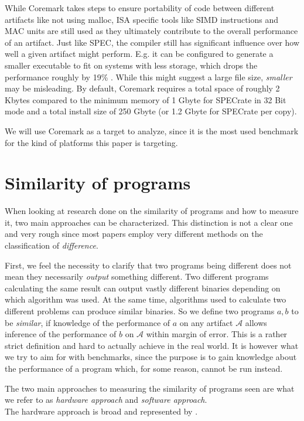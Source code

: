 \documentclass[../bachelor_paper.tex]{subfiles}
\begin{document}
While Coremark takes steps to ensure portability of code between different artifacts like not using malloc, \ac{ISA} specific tools like \ac{SIMD} instructions and \ac{MAC unit}s are still used as they ultimately contribute to the overall performance of an artifact. Just like \ac{SPEC}, the compiler still has significant influence over how well a given artifact might perform. E.g. it can be configured to generate a smaller executable to fit on systems with less storage, which drops the performance roughly by 19\% \cite{gal-onExploringCoremarkBenchmark2012}. While this might suggest a large file size, \textit{smaller} may be misleading. By default, Coremark requires a total space of roughly 2 Kbytes compared to the minimum memory of 1 Gbyte for \ac{SPEC}rate in 32 Bit mode and a total install size of 250 Gbyte (or 1.2 Gbyte for \ac{SPEC}rate per copy). \cite{SystemRequirementsCPU}

We will use Coremark as a target to analyze, since it is the most used benchmark for the kind of platforms this paper is targeting.

\section*{Similarity of programs}
When looking at research done on the similarity of programs and how to measure it, two main approaches can be characterized. This distinction is not a clear one and very rough since most papers employ very different methods on the classification of \textit{difference}. 

First, we feel the necessity to clarify that two programs being different does not mean they necessarily \textit{output} something different. Two different programs calculating the same result can output vastly different binaries depending on which algorithm was used. At the same time, algorithms used to calculate two different problems can produce similar binaries. So we define two programs $a,b$ to be \textit{similar}, if knowledge of the performance of $a$ on any artifact $\mathcal{A}$ allows inference of the performance of $b$ on $\mathcal{A}$ within margin of error. This is a rather strict definition and hard to actually achieve in the real world. It is however what we try to aim for with benchmarks, since the purpose is to gain knowledge about the performance of a program which, for some reason, cannot be run instead.

The two main approaches to measuring the similarity of programs seen are what we refer to as \textit{hardware approach} and \textit{software approach}.\\
The hardware approach is broad and represented by \cite{dujmovicEvolutionEvaluationSPEC1998,vandierendonckManyBenchmarksStress}.


\isstandalone



\fi
\end{document}
